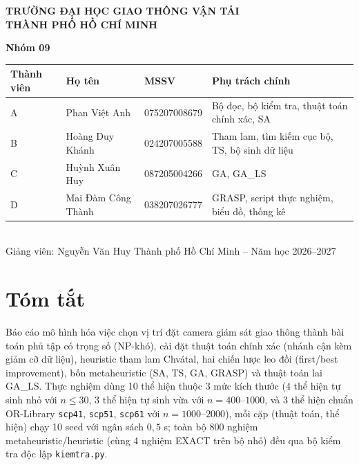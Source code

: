 \documentclass[a4paper,12pt]{article}
\begin{document}
\begin{titlepage}
\centering
{\Large\bfseries TRƯỜNG ĐẠI HỌC GIAO THÔNG VẬN TẢI\\THÀNH PHỐ HỒ CHÍ MINH\par}
\vspace{0.4cm}{\large Ngành Công nghệ thông tin\par}
\vspace{2.5cm}{\LARGE\bfseries BÁO CÁO BÀI TẬP LỚN\par}
\vspace{0.4cm}{\Large\bfseries HỌC PHẦN: PHÂN TÍCH THIẾT KẾ GIẢI THUẬT\par}
\vspace{1.2cm}{\large\bfseries Đề 10: Đặt camera giám sát giao thông\\
Bài toán phủ tập có trọng số (Weighted Set Cover)\par}
\vspace{1.5cm}
{\bfseries Nhóm 09}\\[4pt]
\begingroup\small\begin{tabular}{llll}
\toprule
Thành viên & Họ tên & MSSV & Phụ trách chính\\
\midrule
A & Phan Việt Anh & 075207008679 & Bộ đọc, bộ kiểm tra, thuật toán chính xác, SA\\
B & Hoàng Duy Khánh & 024207005588 & Tham lam, tìm kiếm cục bộ, TS, bộ sinh dữ liệu\\
C & Huỳnh Xuân Huy & 087205004266 & GA, GA\_LS\\
D & Mai Đàm Công Thành & 038207026777 & GRASP, script thực nghiệm, biểu đồ, thống kê \\
\bottomrule
\end{tabular}\endgroup\\[10pt]
Giảng viên: Nguyễn Văn Huy
\vfill Thành phố Hồ Chí Minh -- Năm học 2026--2027
\end{titlepage}

\renewcommand{\contentsname}{Mục lục}
\tableofcontents
\clearpage

\section*{Tóm tắt}
Báo cáo mô hình hóa việc chọn vị trí đặt camera giám sát giao thông thành bài toán phủ tập có trọng số (NP-khó), cài đặt thuật toán chính xác (nhánh cận kèm giảm cỡ dữ liệu), heuristic tham lam Chvátal, hai chiến lược leo đồi (first/best improvement), bốn metaheuristic (SA, TS, GA, GRASP) và thuật toán lai GA\_LS. Thực nghiệm dùng 10 thể hiện thuộc 3 mức kích thước (4 thể hiện tự sinh nhỏ với $n\le30$, 3 thể hiện tự sinh vừa với $n=400$--$1000$, và 3 thể hiện chuẩn OR-Library \texttt{scp41}, \texttt{scp51}, \texttt{scp61} với $n=1000$--$2000$), mỗi cặp (thuật toán, thể hiện) chạy 10 seed với ngân sách $0{,}5$ s; toàn bộ 800 nghiệm metaheuristic/heuristic (cùng 4 nghiệm EXACT trên bộ nhỏ) đều qua bộ kiểm tra độc lập \texttt{kiemtra.py}.
\end{document}
